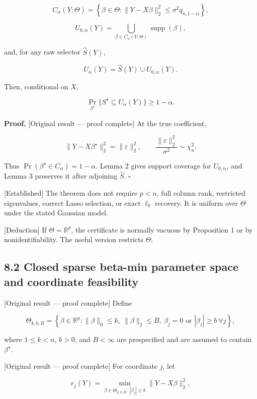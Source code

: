 \documentclass[
  english,
  11pt,
  a4paper,
]{article}
\begin{document}
$$
C_{\alpha}(Y;\Theta)
=
\left\{\beta\in\Theta:
\lVert Y-X\beta\rVert_2^2
\le\sigma^2q_{n,1-\alpha}
\right\},
$$

$$
U_{0,\alpha}(Y)
=
\bigcup_{\beta\in C_\alpha(Y;\Theta)}
\operatorname{supp}(\beta),
$$

and, for any raw selector $\widehat S(Y)$,

$$
U_\alpha(Y)=\widehat S(Y)\cup U_{0,\alpha}(Y).
$$

Then, conditional on $X$,

$$
\Pr_{\beta^\star}\{S^\star\subseteq U_\alpha(Y)\}\ge1-\alpha.
$$

\textbf{Proof.} {[}Original result --- proof complete{]} At the true
coefficient,

$$
\lVert Y-X\beta^\star\rVert_2^2
=
\lVert\varepsilon\rVert_2^2,
\qquad
\frac{\lVert\varepsilon\rVert_2^2}{\sigma^2}\sim\chi_n^2.
$$

Thus $\Pr(\beta^\star\in C_\alpha)=1-\alpha$. Lemma 2 gives support
coverage for $U_{0,\alpha}$, and Lemma 3 preserves it after adjoining
$\widehat S$. $\square$

{[}Established{]} The theorem does not require $p<n$, full column
rank, restricted eigenvalues, correct Lasso selection, or exact
$\ell_0$ recovery. It is uniform over $\Theta$ under the stated
Gaussian model.

{[}Deduction{]} If $\Theta=\mathbb R^p$, the certificate is normally
vacuous by Proposition 1 or by nonidentifiability. The useful version
restricts $\Theta$.

\subsection{8.2 Closed sparse beta-min parameter space and coordinate
feasibility}\label{closed-sparse-beta-min-parameter-space-and-coordinate-feasibility}

{[}Original result --- proof complete{]} Define

$$
\Theta_{k,b,B}
=
\left\{\beta\in\mathbb R^p:
\lVert\beta\rVert_0\le k,
\ \lVert\beta\rVert_2\le B,
\ \beta_j=0\text{ or }|\beta_j|\ge b\ \forall j
\right\},
$$

where $1\le k<n$, $b>0$, and $B<\infty$ are prespecified and are
assumed to contain $\beta^\star$.

{[}Original result --- proof complete{]} For coordinate $j$, let

$$
r_j(Y)=
\min_{\beta\in\Theta_{k,b,B}:\ |\beta_j|\ge b}
\lVert Y-X\beta\rVert_2^2,
$$
\end{document}
